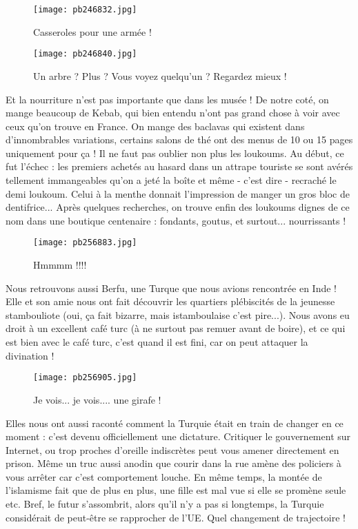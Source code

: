 \documentclass{book}
\begin{document}
\begin{figure}[h]
\centering
\texttt{[image: pb246832.jpg]}
\caption*{Casseroles pour une armée !}
\end{figure}


\begin{figure}[h]
\centering
\texttt{[image: pb246840.jpg]}
\caption*{Un arbre ? Plus ? Vous voyez quelqu'un ? Regardez mieux !}
\end{figure}

Et la nourriture n'est pas importante que dans les musée ! De notre coté, on mange beaucoup de Kebab, qui bien entendu n'ont pas grand chose à voir avec ceux qu'on trouve en France. On mange des baclavas qui existent dans d'innombrables variations, certains salons de thé ont des menus de 10 ou 15 pages uniquement pour ça ! Il ne faut pas oublier non plus les loukoums. Au début, ce fut l'échec : les premiers achetés au hasard dans un attrape touriste se sont avérés tellement immangeables qu'on a jeté la boîte et même - c'est dire - recraché le demi loukoum. Celui à la menthe donnait l'impression de manger un gros bloc de dentifrice... Après quelques recherches, on trouve enfin des loukoums dignes de ce nom dans une boutique centenaire : fondants, goutus, et surtout... nourrissants !


\begin{figure}[h]
\centering
\texttt{[image: pb256883.jpg]}
\caption*{Hmmmm !!!!}
\end{figure}

Nous retrouvons aussi Berfu, une Turque que nous avions rencontrée en Inde ! Elle et son amie nous ont fait découvrir les quartiers plébiscités de la jeunesse stambouliote (oui, ça fait bizarre, mais istamboulaise c'est pire...). Nous avons eu droit à un excellent café turc (à ne surtout pas remuer avant de boire), et ce qui est bien avec le café turc, c'est quand il est fini, car on peut attaquer la divination !


\begin{figure}[h]
\centering
\texttt{[image: pb256905.jpg]}
\caption*{Je vois... je vois.... une girafe !}
\end{figure}

Elles nous ont aussi raconté comment la Turquie était en train de changer en ce moment : c'est devenu officiellement une dictature. Critiquer le gouvernement sur Internet, ou trop proches d'oreille indiscrètes peut vous amener directement en prison. Même un truc aussi anodin que courir dans la rue amène des policiers à vous arrêter car c'est comportement louche. En même temps, la montée de l'islamisme fait que de plus en plus, une fille est mal vue si elle se promène seule etc. Bref, le futur s’assombrit, alors qu'il n'y a pas si longtemps, la Turquie considérait de peut-être se rapprocher de l'UE. Quel changement de trajectoire !
\end{document}
